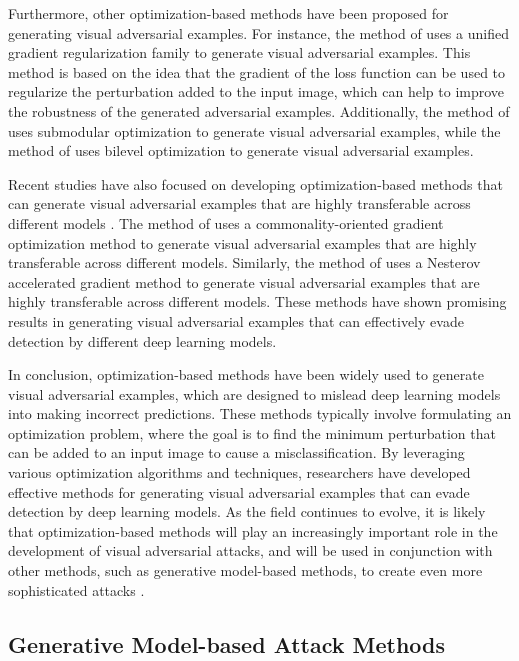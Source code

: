 \documentclass[11pt]{article}
\begin{document}
Furthermore, other optimization-based methods have been proposed for generating visual adversarial examples. For instance, the method of \cite{ref59} uses a unified gradient regularization family to generate visual adversarial examples. This method is based on the idea that the gradient of the loss function can be used to regularize the perturbation added to the input image, which can help to improve the robustness of the generated adversarial examples. Additionally, the method of \cite{ref60} uses submodular optimization to generate visual adversarial examples, while the method of \cite{ref61} uses bilevel optimization to generate visual adversarial examples.

Recent studies have also focused on developing optimization-based methods that can generate visual adversarial examples that are highly transferable across different models \cite{ref62}. The method of \cite{ref63} uses a commonality-oriented gradient optimization method to generate visual adversarial examples that are highly transferable across different models. Similarly, the method of \cite{ref64} uses a Nesterov accelerated gradient method to generate visual adversarial examples that are highly transferable across different models. These methods have shown promising results in generating visual adversarial examples that can effectively evade detection by different deep learning models.

In conclusion, optimization-based methods have been widely used to generate visual adversarial examples, which are designed to mislead deep learning models into making incorrect predictions. These methods typically involve formulating an optimization problem, where the goal is to find the minimum perturbation that can be added to an input image to cause a misclassification. By leveraging various optimization algorithms and techniques, researchers have developed effective methods for generating visual adversarial examples that can evade detection by deep learning models. As the field continues to evolve, it is likely that optimization-based methods will play an increasingly important role in the development of visual adversarial attacks, and will be used in conjunction with other methods, such as generative model-based methods, to create even more sophisticated attacks \cite{ref65}.

\subsection{Generative Model-based Attack Methods}
\end{document}
